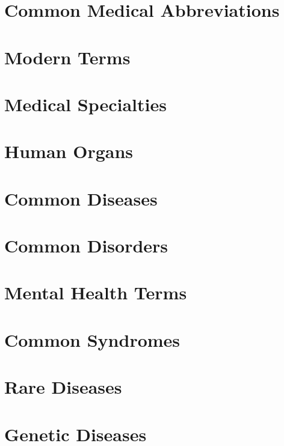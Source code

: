 \documentclass[11pt,twocolumn,twoside]{book}
\newcommand{\1}{\ifmmode\mathbin{\%}\else\%\fi}
\begin{document}
\clearpage
\chapter{Common Medical Abbreviations}



\clearpage
\chapter{Modern Terms}


\clearpage
\chapter{Medical Specialties}


\clearpage
\chapter{Human Organs}


\clearpage
\chapter{Common Diseases}


\clearpage
\chapter{Common Disorders}


\clearpage
\chapter{Mental Health Terms}


\clearpage
\chapter{Common Syndromes}


\clearpage
\chapter{Rare Diseases}


\clearpage
\chapter{Genetic Diseases}

\end{document}
